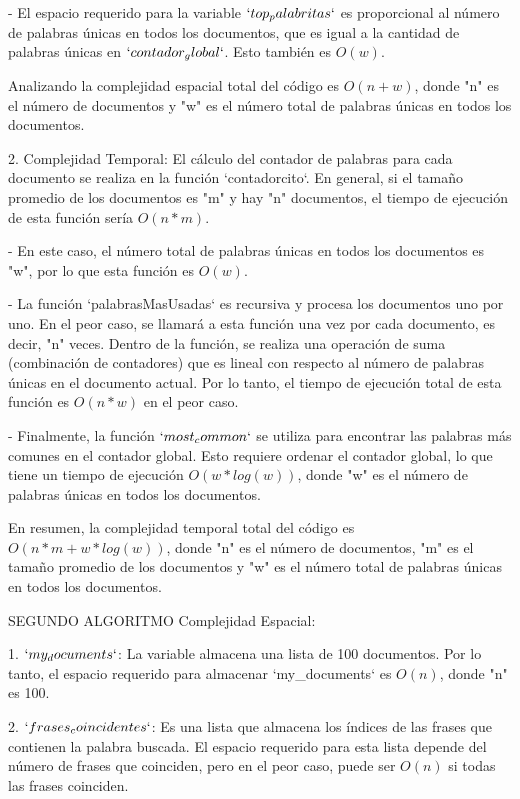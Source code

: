 \documentclass[a4paper,twocolumn,10pt]{article}
\begin{document}
   - El espacio requerido para la variable $`top_palabritas`$ es proporcional al número de palabras únicas en todos los documentos, que es igual a la cantidad de palabras únicas en $`contador_global`$. Esto también es $O(w)$.

   Analizando la complejidad espacial total del código es $O(n + w)$, donde "n" es el número de documentos y "w" es el número total de palabras únicas en todos los documentos.

2. Complejidad Temporal:
    El cálculo del contador de palabras para cada documento se realiza en la función `contadorcito`. En general, si el tamaño promedio de los documentos es "m" y hay "n" documentos, el tiempo de ejecución de esta función sería $O(n * m)$.

   - En este caso, el número total de palabras únicas en todos los documentos es "w", por lo que esta función es $O(w)$.

   - La función `palabrasMasUsadas` es recursiva y procesa los documentos uno por uno. En el peor caso, se llamará a esta función una vez por cada documento, es decir, "n" veces. Dentro de la función, se realiza una operación de suma (combinación de contadores) que es lineal con respecto al número de palabras únicas en el documento actual. Por lo tanto, el tiempo de ejecución total de esta función es $O(n * w)$ en el peor caso.

   - Finalmente, la función $`most_common`$ se utiliza para encontrar las palabras más comunes en el contador global. Esto requiere ordenar el contador global, lo que tiene un tiempo de ejecución $O(w * log(w))$, donde "w" es el número de palabras únicas en todos los documentos.

   En resumen, la complejidad temporal total del código es $O(n * m + w * log(w))$, donde "n" es el número de documentos, "m" es el tamaño promedio de los documentos y "w" es el número total de palabras únicas en todos los documentos.

   SEGUNDO ALGORITMO
Complejidad Espacial:

1. $`my_documents`$: La variable almacena una lista de 100 documentos. Por lo tanto, el espacio requerido para almacenar `my_documents` es $O(n)$, donde "n" es 100.

2. $`frases_coincidentes`$: Es una lista que almacena los índices de las frases que contienen la palabra buscada. El espacio requerido para esta lista depende del número de frases que coinciden, pero en el peor caso, puede ser $O(n)$ si todas las frases coinciden.
\end{document}
